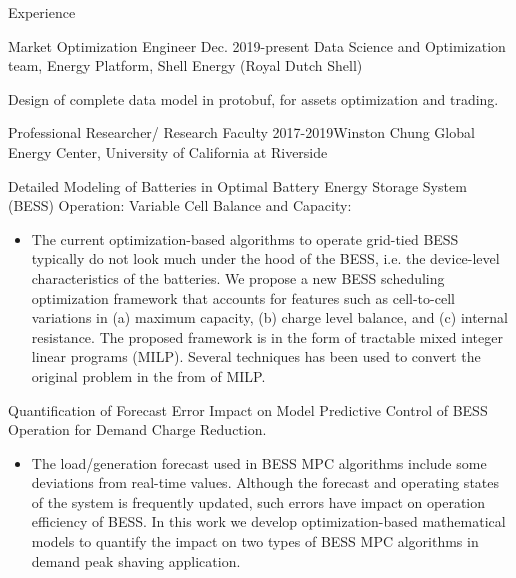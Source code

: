 \documentclass{resume} %
\begin{document}
\begin{rSection}{ Experience}
\begin{rSubsection}{Market Optimization Engineer}{ Dec. 2019-present}{ Data Science and Optimization team, Energy Platform,  Shell Energy (Royal Dutch Shell) }{}
\item[] Design of complete data model in protobuf,  for assets optimization and trading.

\end{rSubsection}


\begin{rSubsection}{Professional Researcher/  Research Faculty}{ 2017-2019}{Winston Chung Global Energy Center, University of California at Riverside}{}

\vspace{0.26cm}

\item[]  Detailed Modeling of Batteries in Optimal Battery Energy Storage System (BESS) Operation: Variable Cell Balance and Capacity:

\begin{itemize}
   \item  []  The current optimization-based algorithms to operate grid-tied BESS typically do not look much under the hood of the BESS, i.e. the device-level characteristics of the batteries. We propose a new BESS
scheduling optimization framework that accounts for features  such as cell-to-cell variations in (a) maximum capacity, (b) charge level balance, and (c) internal resistance. 
The proposed framework is in the form of tractable mixed integer linear programs (MILP). 
Several  techniques has been  used to convert the original problem in the from of MILP.
\end{itemize}

\item[]  Quantification of Forecast Error Impact on  Model Predictive Control of BESS Operation for Demand Charge Reduction.
\begin{itemize}
   \item  []  The load/generation forecast used in BESS MPC algorithms include some deviations from real-time values. 
 Although the forecast and operating states of the system is frequently updated, such errors have impact on operation efficiency of BESS.
In this work we develop optimization-based mathematical models to quantify the impact on two types of BESS MPC algorithms in demand peak shaving application.  
\end{itemize}


\end{rSubsection}
\end{rSection}
\end{document}
